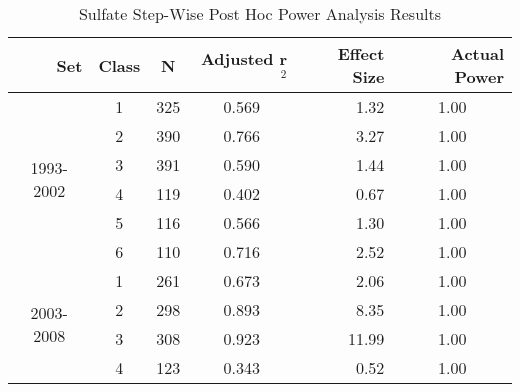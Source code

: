 \begin{table}\tiny
  \centering
	  \caption{Sulfate Step-Wise Post Hoc Power Analysis Results}
    \begin{tabular}{rrcrrr}
    \toprule
    Set   & Class & N     & Adjusted r$^2$ & \multicolumn{1}{p{.5cm}}{Effect Size} & Actual Power \\
    \midrule
    \multicolumn{1}{c}{\multirow{6}[1]{*}{\begin{sideways}1993-2002\end{sideways}}} & \multicolumn{1}{c}{1} & \multicolumn{1}{c}{325} & \multicolumn{1}{c}{0.569 } & \multicolumn{1}{r}{1.32 } & \multicolumn{1}{c}{1.00 } \\
    \multicolumn{1}{c}{} & \multicolumn{1}{c}{2} & \multicolumn{1}{c}{390} & \multicolumn{1}{c}{0.766 } & \multicolumn{1}{r}{3.27 } & \multicolumn{1}{c}{1.00 } \\
    \multicolumn{1}{c}{} & \multicolumn{1}{c}{3} & \multicolumn{1}{c}{391} & \multicolumn{1}{c}{0.590 } & \multicolumn{1}{r}{1.44 } & \multicolumn{1}{c}{1.00 } \\
    \multicolumn{1}{c}{} & \multicolumn{1}{c}{4} & \multicolumn{1}{c}{119} & \multicolumn{1}{c}{0.402 } & \multicolumn{1}{r}{0.67 } & \multicolumn{1}{c}{1.00 } \\
    \multicolumn{1}{c}{} & \multicolumn{1}{c}{5} & \multicolumn{1}{c}{116} & \multicolumn{1}{c}{0.566 } & \multicolumn{1}{r}{1.30 } & \multicolumn{1}{c}{1.00 } \\
    \multicolumn{1}{c}{} & \multicolumn{1}{c}{6} & \multicolumn{1}{c}{110} & \multicolumn{1}{c}{0.716 } & \multicolumn{1}{r}{2.52 } & \multicolumn{1}{c}{1.00 } \\\midrule
    \multicolumn{1}{c}{\multirow{6}[2]{*}{\begin{sideways}2003-2008\end{sideways}}} & \multicolumn{1}{c}{1} & \multicolumn{1}{c}{261} & \multicolumn{1}{c}{0.673 } & \multicolumn{1}{r}{2.06 } & \multicolumn{1}{c}{1.00 } \\
    \multicolumn{1}{c}{} & \multicolumn{1}{c}{2} & \multicolumn{1}{c}{298} & \multicolumn{1}{c}{0.893 } & \multicolumn{1}{r}{8.35 } & \multicolumn{1}{c}{1.00 } \\
    \multicolumn{1}{c}{} & \multicolumn{1}{c}{3} & \multicolumn{1}{c}{308} & \multicolumn{1}{c}{0.923 } & \multicolumn{1}{r}{11.99 } & \multicolumn{1}{c}{1.00 } \\
    \multicolumn{1}{c}{} & \multicolumn{1}{c}{4} & \multicolumn{1}{c}{123} & \multicolumn{1}{c}{0.343 } & \multicolumn{1}{r}{0.52 } & \multicolumn{1}{c}{1.00 } \\

\end{tabular}
\end{table}
